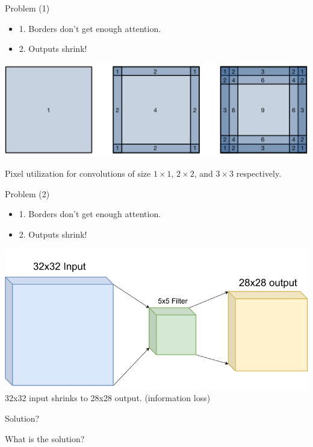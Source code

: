 \documentclass[default, aspectratio=169]{beamer}
\begin{document}
	\begin{frame}{Problem (1)}
		
		\begin{itemize}
			\item \color{red} \Large 1. Borders don't get enough attention.
			\item \Large 2. Outputs shrink!
		\end{itemize}
		
		\centering
		\includegraphics[keepaspectratio, scale=0.4]{pic/padding1.png}
		
		\small Pixel utilization for convolutions of size $1 \times 1$, $2 \times 2$, and $3 \times 3$ respectively.
	\end{frame}
		
	\begin{frame}{Problem (2)}
		
		\begin{itemize}
			\item \Large 1. Borders don't get enough attention.
			\item \color{red} \Large 2. Outputs shrink!
		\end{itemize}
		
		\centering
		\includegraphics[keepaspectratio, scale=0.25]{pic/Padding2.png}
		\smallskip
		\small 32x32 input shrinks to 28x28 output. (information loss)
	\end{frame}
	
	
	\begin{frame}{Solution?}
		\begin{center}
			\LARGE What is the solution?
		\end{center}
	\end{frame}
	
\end{document}

